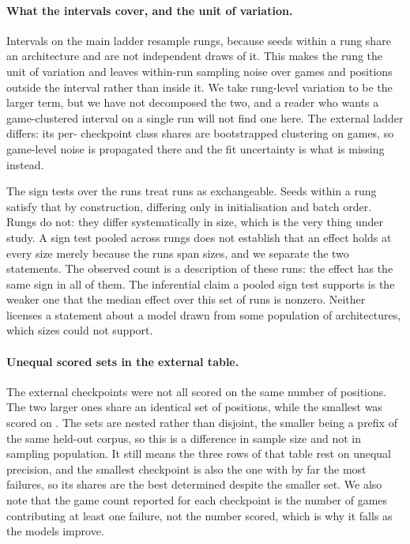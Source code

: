 \documentclass[11pt]{article}
\begin{document}

\paragraph{What the intervals cover, and the unit of variation.}
Intervals on the main ladder resample rungs, because seeds within a rung share an
architecture and are not independent draws of it. This makes the rung the unit of
variation and leaves within-run sampling noise over games and positions outside the
interval rather than inside it. We take rung-level variation to be the larger term,
but we have not decomposed the two, and a reader who wants a game-clustered interval
on a single run will not find one here. The external ladder differs: its per-
checkpoint class shares are bootstrapped clustering on games, so game-level noise is
propagated there and the fit uncertainty is what is missing instead.

The sign tests over the  runs treat runs as exchangeable. Seeds within a rung
satisfy that by construction, differing only in initialisation and batch order.
Rungs do not: they differ systematically in size, which is the very thing under
study. A sign test pooled across rungs does not establish that an effect holds at every size
merely because the runs span sizes, and we separate the two statements. The observed
count is a description of these runs: the effect has the same sign in all of them.
The inferential claim a pooled sign test supports is the weaker one that the median
effect over this set of runs is nonzero. Neither licenses a statement about a model
drawn from some population of architectures, which  sizes could not support.

\paragraph{Unequal scored sets in the external table.}
The external checkpoints were not all scored on the same number of positions. The
two larger ones share an identical set of  positions, while the smallest was
scored on . The sets are nested rather than disjoint, the smaller being a
prefix of the same held-out corpus, so this is a difference in sample size and not
in sampling population. It still means the three rows of that table rest on unequal
precision, and the smallest checkpoint is also the one with by far the most failures,
so its shares are the best determined despite the smaller set. We also note that the
game count reported for each checkpoint is the number of games contributing at least
one failure, not the number scored, which is why it falls as the models improve.
\end{document}
